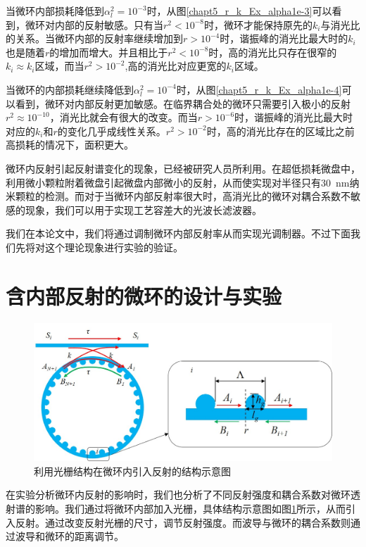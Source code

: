 当微环内部损耗降低到$\alpha_l^2 = 10^{-3}$时，从图\ref{chapt5_r_k_Ex_alpha1e-3}可以看到，微环对内部的反射敏感。只有当$r^2<10^{-8}$时，微环才能保持原先的$k_i$与消光比的关系。当微环内部的反射率继续增加到$r>10^{-4}$时，谐振峰的消光比最大时的$k_i$也是随着$r$的增加而增大。并且相比于$r^2<10^{-8}$时，高的消光比只存在很窄的$k_i\approx k_i$区域，而当$r^2>10^{-2}$,高的消光比对应更宽的$k_i$区域。

当微环的内部损耗继续降低到$\alpha_l^2=10^{-4}$时，从图\ref{chapt5_r_k_Ex_alpha1e-4}可以看到，微环对内部反射更加敏感。在临界耦合处的微环只需要引入极小的反射{$r^2\approx 10^{-10}$}，消光比就会有很大的改变。而当$r>10^{-6}$时，谐振峰的消光比最大时对应的$k_i$和$r$的变化几乎成线性关系。$r^2>10^{-2}$时，高的消光比存在的区域比之前高损耗的情况下，面积更大。

微环内反射引起反射谱变化的现象，已经被研究人员所利用。在超低损耗微盘中，利用微小颗粒附着微盘引起微盘内部微小的反射，从而使实现对半径只有30~nm纳米颗粒的检测\cite{zhu2010chip}。而对于当微环内部反射率很大时，高消光比的微环对耦合系数不敏感的现象，我们可以用于实现工艺容差大的光波长滤波器\cite{qiangsheng2015fsr}。

我们在本论文中，我们将通过调制微环内部反射率从而实现光调制器。不过下面我们先将对这个理论现象进行实验的验证。
\section{含内部反射的微环的设计与实验}
\begin{figure}[htb]
	\centering
	\includegraphics[width=12cm]{./Pictures/chapt5_ring_grating_reflector_structure.jpg}
	\caption{利用光栅结构在微环内引入反射的结构示意图}
	\label{chapt5_ring_grating_reflector_structure}
\end{figure}

在实验分析微环内反射的影响时，我们也分析了不同反射强度和耦合系数对微环透射谱的影响。我们通过将微环内部加入光栅，具体结构示意图如图\ref{chapt5_ring_grating_reflector_structure}所示，从而引入反射。通过改变反射光栅的尺寸，调节反射强度。而波导与微环的耦合系数则通过波导和微环的距离调节。
